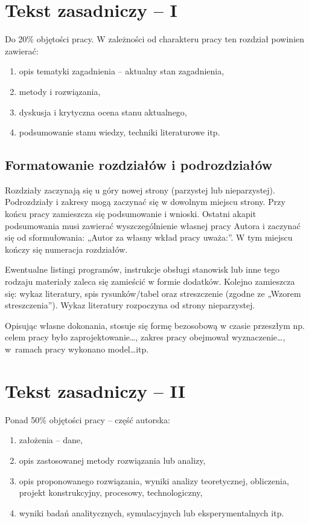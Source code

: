 \documentclass[12pt,twoside]{article}
\begin{document}
\clearpage

\section{Tekst zasadniczy -- I}

Do 20\% objętości pracy. W zależności od charakteru pracy ten rozdział powinien zawierać:
\begin{enumerate}[label=\alph*), leftmargin=1.25cm]
	\item opis tematyki zagadnienia -- aktualny stan zagadnienia,
	\item metody i rozwiązania,
	\item dyskusja i krytyczna ocena stanu aktualnego,
	\item podsumowanie stanu wiedzy, techniki literaturowe itp.
\end{enumerate}

\subsection{Formatowanie rozdziałów i podrozdziałów}
Rozdziały zaczynają się u góry nowej strony (parzystej lub nieparzystej). Podrozdziały i zakresy mogą zaczynać się w dowolnym miejscu strony. Przy końcu pracy zamieszcza się podsumowanie i wnioski. Ostatni akapit podsumowania musi zawierać wyszczególnienie własnej pracy Autora i zaczynać się od sformułowania: „Autor za własny wkład pracy uważa:”. W tym miejscu kończy się numeracja rozdziałów.

Ewentualne listingi programów, instrukcje obsługi stanowisk lub inne tego rodzaju materiały zaleca się zamieścić w formie dodatków. Kolejno zamieszcza się: wykaz literatury, spis rysunków/tabel oraz streszczenie (zgodne ze „Wzorem streszczenia”). Wykaz literatury rozpoczyna od strony nieparzystej.

Opisując własne dokonania, stosuje się formę bezosobową w czasie przeszłym np. celem pracy było zaprojektowanie\ldots, zakres pracy obejmował wyznaczenie\ldots, w~ramach pracy wykonano model\ldots itp.
\clearpage	

\section{Tekst zasadniczy -- II}

Ponad 50\% objętości pracy -- część autorska:
\begin{enumerate}[label=\alph*), leftmargin=1.25cm] 
	\item założenia – dane,
	\item opis zastosowanej metody rozwiązania lub analizy,
	\item opis proponowanego rozwiązania, wyniki analizy teoretycznej, obliczenia, projekt konstrukcyjny, procesowy, technologiczny,
	\item wyniki badań analitycznych, symulacyjnych lub eksperymentalnych itp.
\end{enumerate}
\end{document}
